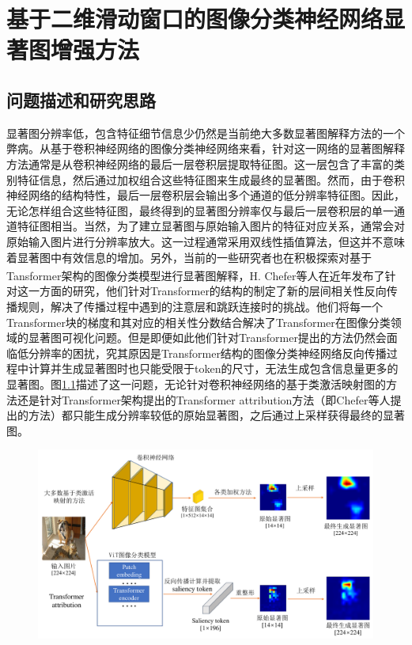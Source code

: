 



\chapter{基于二维滑动窗口的图像分类神经网络显著图增强方法}
\thispagestyle{others}
\pagestyle{others}
\xiaosi




\section{问题描述和研究思路}

显著图分辨率低，包含特征细节信息少仍然是当前绝大多数显著图解释方法的一个弊病。从基于卷积神经网络的图像分类神经网络来看，针对这一网络的显著图解释方法通常是从卷积神经网络的最后一层卷积层提取特征图。这一层包含了丰富的类别特征信息，然后通过加权组合这些特征图来生成最终的显著图。然而，由于卷积神经网络的结构特性，最后一层卷积层会输出多个通道的低分辨率特征图。因此，无论怎样组合这些特征图，最终得到的显著图分辨率仅与最后一层卷积层的单一通道特征图相当。当然，为了建立显著图与原始输入图片的特征对应关系，通常会对原始输入图片进行分辨率放大。这一过程通常采用双线性插值算法，但这并不意味着显著图中有效信息的增加。另外，当前的一些研究者也在积极探索对基于Tansformer架构的图像分类模型进行显著图解释，H. Chefer等人\textsuperscript{\cite{chefer2021transformer}}在近年发布了针对这一方面的研究，他们针对Transformer的结构的制定了新的层间相关性反向传播规则，解决了传播过程中遇到的注意层和跳跃连接时的挑战。他们将每一个Transformer块的梯度和其对应的相关性分数结合解决了Transformer在图像分类领域的显著图可视化问题。但是即便如此他们针对Transformer提出的方法仍然会面临低分辨率的困扰，究其原因是Transformer结构的图像分类神经网络反向传播过程中计算并生成显著图时也只能受限于token的尺寸，无法生成包含信息量更多的显著图。图\ref{fig:motivation}描述了这一问题，无论针对卷积神经网络的基于类激活映射图的方法还是针对Transformer架构提出的Transformer attribution方法（即Chefer等人提出的方法）都只能生成分辨率较低的原始显著图，之后通过上采样获得最终的显著图。

\begin{figure}[h]
	\centering 
	\includegraphics[width=15cm]{fig/ch4/motivation.pdf}
	\label{fig:motivation}
\end{figure}


